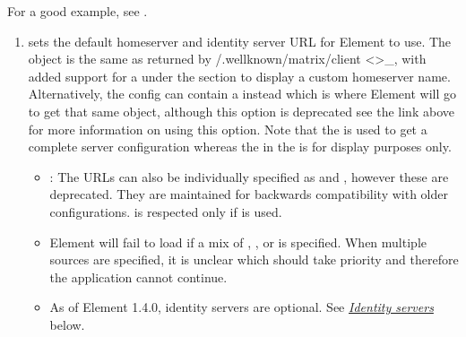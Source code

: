\documentclass[letterpaper,10pt,openany,oneside,english]{sphinxmanual}
\begin{document}
\sphinxAtStartPar
For a good example, see .
\begin{enumerate}
%
\item {} 
\sphinxAtStartPar
{} sets the default homeserver and identity server URL for
Element to use. The object is the same as returned by /.well\sphinxhyphen{}known/matrix/client \textless{}\textgreater{}\textasciigrave{}\_,
with added support for a  under the  section to display
a custom homeserver name. Alternatively, the config can contain a 
instead which is where Element will go to get that same object, although this option is
deprecated \sphinxhyphen{} see the  link above for more information on using this option.
Note that the  is used to get a complete server configuration
whereas the  in the  is for display purposes only.
\begin{itemize}
\item {} 
\sphinxAtStartPar
{}: The URLs can also be individually specified as  and
, however these are deprecated. They are maintained for backwards
compatibility with older configurations.  is respected only
if  is used.

\item {} 
\sphinxAtStartPar
Element will fail to load if a mix of , , or
 is specified. When multiple sources are specified, it is unclear
which should take priority and therefore the application cannot continue.

\item {} 
\sphinxAtStartPar
As of Element 1.4.0, identity servers are optional. See {\hyperref[\detokenize{config:identity-servers}]{\emph{Identity servers}}} below.


\end{itemize}
\end{enumerate}
\end{document}
